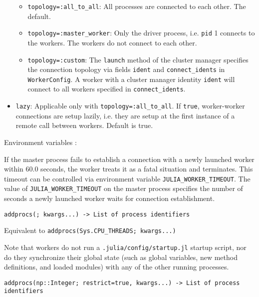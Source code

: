 \begin{adjustwidth}{2em}{0pt}
\begin{itemize}
\begin{itemize}
\item \texttt{topology=:all\_to\_all}: All processes are connected to each other. The default.


\item \texttt{topology=:master\_worker}: Only the driver process, i.e. \texttt{pid} 1 connects to the workers. The workers do not connect to each other.


\item \texttt{topology=:custom}: The \texttt{launch} method of the cluster manager specifies the connection topology via fields \texttt{ident} and \texttt{connect\_idents} in \texttt{WorkerConfig}. A worker with a cluster manager identity \texttt{ident} will connect to all workers specified in \texttt{connect\_idents}.

\end{itemize}

\item \texttt{lazy}: Applicable only with \texttt{topology=:all\_to\_all}. If \texttt{true}, worker-worker connections are setup lazily, i.e. they are setup at the first instance of a remote call between workers. Default is true.

\end{itemize}
Environment variables :

If the master process fails to establish a connection with a newly launched worker within 60.0 seconds, the worker treats it as a fatal situation and terminates. This timeout can be controlled via environment variable \texttt{JULIA\_WORKER\_TIMEOUT}. The value of \texttt{JULIA\_WORKER\_TIMEOUT} on the master process specifies the number of seconds a newly launched worker waits for connection establishment.




\begin{lstlisting}
addprocs(; kwargs...) -> List of process identifiers
\end{lstlisting}

Equivalent to \texttt{addprocs(Sys.CPU\_THREADS; kwargs...)}

Note that workers do not run a \texttt{.julia/config/startup.jl} startup script, nor do they synchronize their global state (such as global variables, new method definitions, and loaded modules) with any of the other running processes.




\begin{lstlisting}
addprocs(np::Integer; restrict=true, kwargs...) -> List of process identifiers
\end{lstlisting}


\end{adjustwidth}
